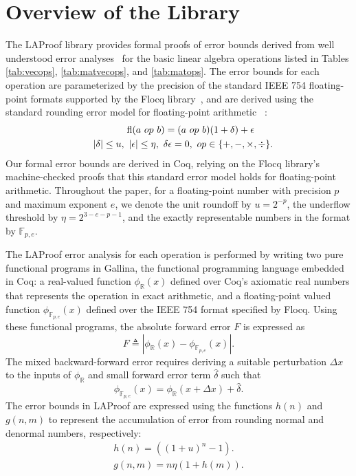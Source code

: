 
\section{Overview of the Library}\label{sec:lib}
The LAProof library provides formal proofs of error bounds derived from well understood error analyses~\cite{demmel_book,higham_book} for the basic linear algebra operations listed in Tables \ref{tab:vecops}, \ref{tab:matvecops}, and \ref{tab:matops}. The error bounds for each operation are parameterized by the precision of the standard IEEE 754 floating-point formats supported by the Flocq library~\cite{flocq}, and are derived using the standard rounding error model for floating-point
arithmetic ~\cite[sect 2.2]{higham_book}:
\begin{align}
\fl(a \ op \ b) = (a \ & op \ b)(1 + \delta) + \epsilon
\label{eq:errormodel} \\
\quad |\delta| \le u, \ |\epsilon| \le \eta, \ \delta \epsilon =0 &, \ op \in \{+, -, \times, \div \} \nonumber.
\end{align}
Our formal error bounds are derived in Coq, relying on the Flocq library's machine-checked proofs
\cite{flocq} that this standard error model holds for floating-point arithmetic.  Throughout the paper, for a floating-point number with precision $p$ and maximum exponent $e$, we denote the unit roundoff by $u =2^{-p} $, the underflow threshold by $\eta = 2^{3-e-p-1}$, and the exactly representable numbers in the format by  $\mathbb{F}_{p,e}$.

The LAProof error analysis for each operation is performed by writing two pure functional programs in Gallina, the functional programming language embedded in Coq: a real-valued function $\phi_\mathbb{R}(x)$ defined over Coq's axiomatic real numbers that represents the operation in exact arithmetic, and a floating-point valued function $\phi_{\mathbb{F}_{p,e}}(x)$ defined over the IEEE 754  format specified by Flocq.  Using these functional programs, the absolute forward error $F$ is expressed as 
\begin{equation}
F \triangleq | \phi_\mathbb{R}(x) - \phi_{\mathbb{F}_{p,e}}(x)| .
\end{equation}
The mixed backward-forward error requires deriving a suitable perturbation  $\Delta x$  to the inputs of $\phi_{\mathbb{R}}$ and  small forward error term $ \hat{\delta}$ such that
\begin{equation}
 \phi_{\mathbb{F}_{p,e}}(x) = \phi_\mathbb{R} (x + \Delta x) + \hat{\delta}. \label{eq:BE}
\end{equation}
The error bounds in LAProof are expressed using the functions $h(n)$ and
$g(n,m)$ to represent the accumulation of error from
rounding normal and denormal numbers, respectively:
\begin{align}
    h(n) = ((1 + u) ^n - 1). \label{eq:hdef} \\
    g(n,m)= n\eta (1 + h(m)). \label{eq:gdef}
\end{align}

